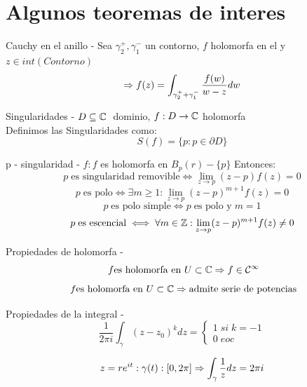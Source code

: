 \section{Algunos teoremas de interes}

\begin{Theorem}{Cauchy en el anillo}
    - Sea $\gamma_2^+, \gamma_1^-$ un contorno, $f$ holomorfa en el y $z \in int(Contorno)$ 
    $$\Rightarrow f(z) = \int_{\gamma_2^+ + \gamma_1^-} \frac{f(w)}{w-z} dw $$
\end{Theorem}

\begin{Definition}{Singularidades}
    - $D \subseteq \mathbb{C} \;$ dominio, $f: D \to \mathbb{C}$ holomorfa \\
    Definimos las Singularidades como:
    $$ S(f) = \{ p: p \in \partial D\}$$ 
\end{Definition}

\begin{Definition}{p - singularidad}
    - $f: f$ es holomorfa en $B_p(r) - \{ p \}$
    Entonces:
    $$ p \;\text{es singularidad removible} \iff \lim_{z \to p} (z - p) f(z) = 0 $$
    $$ p \;\text{es polo} \iff \exists m \geq 1 : \lim_{z \to p} (z-p)^{m+1} f(z) = 0 $$
    $$ p \;\text{es polo simple} \iff p \; \text{es polo y} \; m = 1 $$
    $$ p \;\text{es escencial} \iff \forall m \in \mathbb{Z} : \lim_{z \to p} (z-p)^{m+1} f(z) \neq 0 $$
\end{Definition}

\begin{Proposition}{Propiedades de holomorfa}
    - $$ \;f \text{es holomorfa en } U \subset \mathbb{C} \Rightarrow f \in \mathcal{C}^\infty $$ 
    $$ \;f \text{es holomorfa en } U \subset \mathbb{C} \Rightarrow \text{admite serie de potencias} $$
\end{Proposition}

\begin{Proposition}{Propiedades de la integral}
    - $$ \frac{1}{2\pi i} \int_{\gamma} (z-z_0)^k dz = \begin{cases}
        1 \; si \; k = -1 \\
        0 \; eoc
    \end{cases} $$
    
    $$ z = r e^{it}: \gamma(t) : [0, 2\pi] \Rightarrow \int_\gamma \frac{1}{z} dz  = 2\pi i$$
\end{Proposition}

